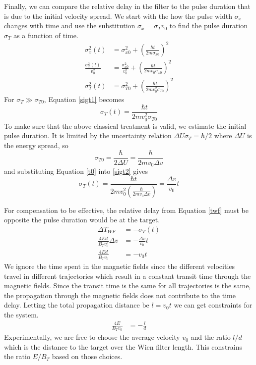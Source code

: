 \documentclass[12pt,letterpaper]{article}
\newcommand{\eqqref}[1]{Equation \ref{#1}}
\newcommand{\dv}{\Delta v}
\newcommand{\dd}{\Delta }
\begin{document}
Finally, we can compare the relative delay in the filter to the pulse duration that is due to the initial velocity spread. 
We start with the how the pulse width $\sigma_x$ changes with time \cite{tannoudji} and use the substitution $\sigma_{x}=\sigma_T v_0$ to find the pulse duration $\sigma_T$ as a function of time.
\begin{align}
   \sigma_x^2(t) &= \sigma_{x0}^2 +\left(\frac{\hbar t}{2 m \sigma_{x0}}\right)^2 \nonumber \\
   \frac{\sigma_x^2(t)}{v_0^2} &= \frac{\sigma_{x0}^2}{v_0^2} +\left(\frac{\hbar t}{2 m v_0 \sigma_{x0}}\right)^2 \nonumber \\
   \sigma_T^2(t) &= \sigma_{T0}^2 +\left(\frac{\hbar t}{2 m v_0^2 \sigma_{T0}}\right)^2
   \label{sigt1}
\end{align}
For $\sigma_T\gg\sigma_{T0}$, \eqqref{sigt1} becomes
\begin{equation}
   \sigma_T(t) = \frac{\hbar t }{2mv_0^2\sigma_{T0}}
   \label{sigt2}
\end{equation}
To make sure that the above classical treatment is valid, we estimate the initial pulse duration. 
It is limited by the uncertainty relation $\Delta U \sigma_T= \hbar/2$ where $\Delta U$ is the energy spread, so
\begin{equation}
   \sigma_{T0} = \frac{\hbar}{2\dd U}= \frac{\hbar}{2mv_0\dv}
   \label{t0}
\end{equation}
and substituting \eqqref{t0} into \ref{sigt2} gives
\begin{equation}
   \sigma_T(t) = \frac{\hbar t }{2mv_0^2\left(\frac{\hbar}{2mv_0\dv}\right)} =\frac{ \dv}{v_0} t
   \label{sigt}
\end{equation}

For compensation to be effective, the relative delay from \eqqref{twf} must be opposite the pulse duration would be at the target.
\begin{align}
   \dd T_{WF} &= -\sigma_T(t) \nonumber\\
   \frac{4 E d}{B_T v_0^3}\dv &= -\frac{ \dv}{v_0} t \nonumber \\
   \frac{4 E d}{B_Tv_0} &= - v_0 t
   \label{vtrel}
\end{align}
We ignore the time spent in the magnetic fields since the different velocities travel in different trajectories which result in a constant transit time through the magnetic fields. 
Since the transit time is the same for all trajectories is the same, the propagation through the magnetic fields does not contribute to the time delay. 
Letting the total propagation distance be $l=v_0 t$ we can get constraints for the system. 
\begin{align}
   \frac{4 E}{B_Tv_0} &= -\frac{l}{d}
   \label{result}
\end{align}
Experimentally, we are free to choose the average velocity $v_0$ and the ratio $l/d$ which is the distance to the target over the Wien filter length. 
This constrains the ratio $E/B_T$ based on those choices.
\end{document}
